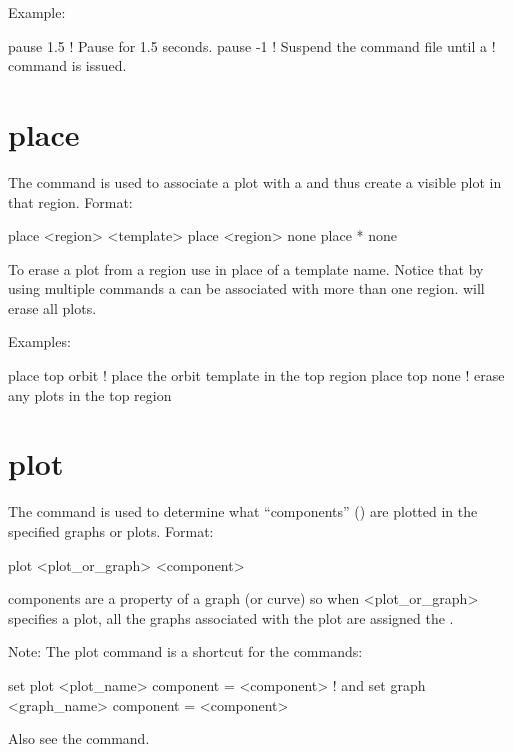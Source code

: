 Example:
\begin{example}
  pause 1.5    ! Pause for 1.5 seconds.
  pause -1     ! Suspend the command file until a  
               !   command is issued.
\end{example}

\section{place}
\label{s:place}

The  command is used to associate a  plot with a 
and thus create a visible plot in that region. Format:
\begin{example}
  place <region> <template>
  place <region> none
  place * none
\end{example}

\vskip 10pt 

To erase a plot from a region use  in place of a template name. Notice that by
using multiple  commands a  can be associated with more than one
region.   will erase all plots.

Examples:
\begin{example}
  place top orbit  ! place the orbit template in the top region
  place top none   ! erase any plots in the top region
\end{example}

\section{plot}
\label{s:plot}

The  command is used to determine what ``components'' () are
plotted in the specified graphs or plots. Format:
\begin{example}
  plot <plot_or_graph> <component>
\end{example}

\vskip 10pt 

components are a property of a graph (or curve) so when <plot_or_graph> specifies a plot,
all the graphs associated with the plot are assigned the .

Note: The plot command is a shortcut for the commands:
\begin{example}
  set plot <plot_name> component = <component>     ! and
  set graph <graph_name> component = <component>
\end{example}
Also see the  command.

